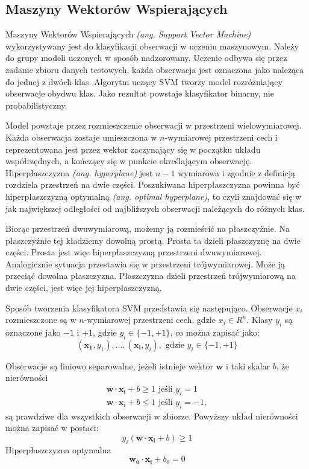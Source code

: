 \documentclass[a4paper,12pt,twoside,openany]{report}
\newcommand{\ang}[1]{\textit{(ang. #1)}}
\begin{document}
\begin{enumerate}
\subsection{Maszyny Wektorów Wspierających}

Maszyny Wektorów Wspierających \ang{Support Vector Machine} wykorzystywany jest do klasyfikacji obserwacji w uczeniu maszynowym.
Należy do grupy modeli uczonych w sposób nadzorowany. 
Uczenie odbywa się przez zadanie zbioru danych testowych, 
każda obserwacja jest oznaczona jako należąca do jednej z dwóch klas.
Algorytm uczący SVM tworzy model rozróżniający obserwacje obydwu klas.
Jako rezultat powstaje klasyfikator binarny, nie probabilistyczny. 

Model powstaje przez rozmieszczenie obserwacji w przestrzeni wielowymiarowej.
Każda obserwacja zostaje umieszczona w $n$-wymiarowej przestrzeni cech i reprezentowana jest przez wektor
zaczynający się w początku układu współrzędnych, a kończący się w punkcie określającym obserwację. 
Hiperpłaszczyzna \ang{hyperplane} jest $n-1$ wymiarowa i zgodnie z definicją rozdziela przestrzeń na dwie części.
Poszukiwana hiperpłaszczyzna powinna być hiperpłaszczyzną optymalną \ang{optimal hyperplane}, 
to czyli znajdować się w jak największej odległości od najbliższych obserwacji należących do różnych klas.
\cite{Cortes1995}

Biorąc przestrzeń dwuwymiarową, możemy ją rozmieścić na płaszczyźnie. 
Na płaszczyźnie tej kładziemy dowolną prostą. 
Prosta ta dzieli płaszczyznę na dwie części.
Prosta jest więc hiperpłaszczyzną przestrzeni dwuwymiarowej.
Analogicznie sytuacja przestawia się w przestrzeni trójwymiarowej.
Może ją przeciąć dowolna płaszczyzna.
Płaszczyzna dzieli przestrzeń trójwymiarową na dwie części, jest więc jej hiperpłaszczyzną.

Sposób tworzenia klasyfikatora SVM przedstawia się następująco.
Obserwacje $x_i$ rozmieszczone są w $n$-wymiarowej przestrzeni cech, gdzie $x_i \in R^n$.
Klasy $y_i$ są oznaczone jako $-1$ i $+1$, gdzie $y_i \in \{-1, +1\}$, co można zapisać jako:
\begin{equation}
	(\bm{x_1},y_1), ..., (\bm{x_i}, y_i), \textrm{ gdzie } y_i \in \{-1, +1\}
\end{equation}

Obserwacje są liniowo separowalne, jeżeli istnieje wektor $\bm{w}$ i taki skalar $b$, że nierówności
\begin{gather}
	\bm{w} \cdot \bm{x_i} + b \geq 1 \textrm{ jeśli } y_i = 1\\
	\bm{w} \cdot \bm{x_i} + b \leq 1 \textrm{ jeśli } y_i = -1,
\end{gather}
są prawdziwe dla wszystkich obserwacji w zbiorze.
\cite{Cortes1995}
Powyższy układ nierówności można zapisać w postaci:
\begin{equation}
	y_i(\bm{w} \cdot \bm{x_i} + b) \geq 1
\end{equation}
Hiperpłaszczyzna optymalna 
\begin{equation}
	\bm{w_0} \cdot \bm{x_i}  + b_0 = 0
\end{equation}


\end{enumerate}
\end{document}
